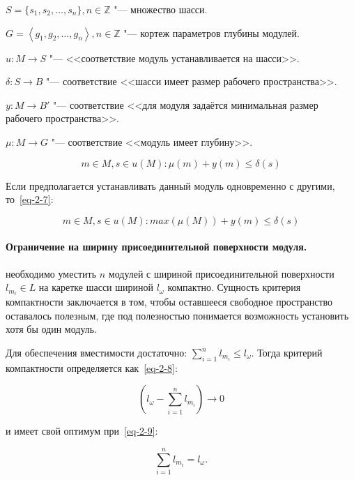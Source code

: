 \noindent $S = \{s_1, s_2, \ldots, s_n\}, n \in \mathbb{Z} $ "--- множество шасси.

\noindent $G = \left \langle g_1, g_2, \ldots, g_n\right \rangle, n \in \mathbb{Z} $ "--- кортеж параметров глубины модулей.

\noindent $u: M \rightarrow S$ "--- <<соответствие модуль устанавливается на шасси>>.

\noindent $\delta: S \rightarrow B$ "--- соответствие <<шасси имеет размер рабочего пространства>>.

\noindent $y: M \rightarrow B'$ "--- соответствие <<для модуля задаётся минимальная размер рабочего пространства>>.

\noindent $\mu: M \rightarrow G$ "--- соответствие <<модуль имеет глубину>>.
 
\begin{equation}
m \in M, s \in u(M): \mu(m) + y(m) \leq \delta(s)
\label{eq-2-6}
\end{equation}

Если предполагается устанавливать данный модуль одновременно с другими, то~\cref{eq-2-7}:

\begin{equation}
m \in M, s \in u(M): max(\mu(M)) + y(m) \leq \delta(s)
\label{eq-2-7}
\end{equation}

\paragraph{Ограничение на ширину присоединительной поверхности модуля.} необходимо уместить $n$ модулей с шириной присоединительной поверхности $l_{m_i} \in L$ на каретке шасси шириной $l_\omega$ компактно. Сущность критерия компактности заключается в том, чтобы оставшееся свободное пространство оставалось полезным, где под полезностью понимается возможность установить хотя бы один модуль.

\noindent Для обеспечения вместимости достаточно: $\sum_{i=1}^{n}l_{m_i} \leq l_\omega$.
\noindent Тогда критерий компактности определяется как~\cref{eq-2-8}: 

\begin{equation}
\left ( l_\omega - \sum_{i=1}^{n} l_{m_i} \right )\rightarrow 0
\label{eq-2-8} 
\end{equation}

\noindent и имеет свой оптимум при~\cref{eq-2-9}:

\begin{equation}
\sum_{i=1}^{n} l_{m_i} = l_\omega.
\label{eq-2-9}
\end{equation}

